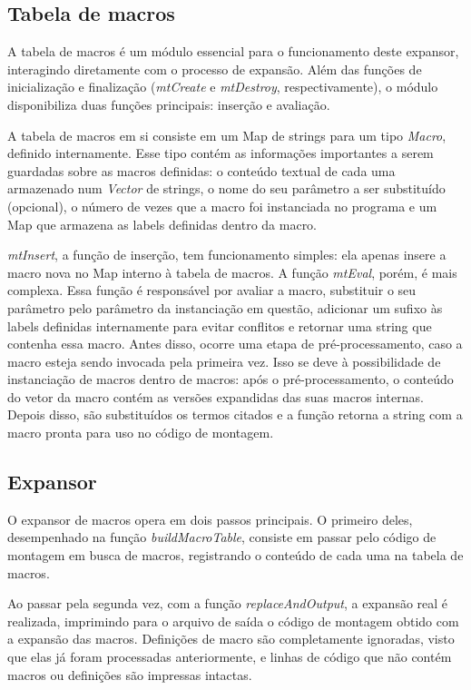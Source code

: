 \documentclass[12pt,a4paper]{article}
\numberwithin{equation}{section}
\begin{document}
\subsection{Tabela de macros}

A tabela de macros é um módulo essencial para o funcionamento deste expansor, interagindo diretamente com o processo de expansão. Além das funções de inicialização e finalização (\emph{mtCreate} e \emph{mtDestroy}, respectivamente), o módulo disponibiliza duas funções principais: inserção e avaliação.

A tabela de macros em si consiste em um Map de strings para um tipo \emph{Macro}, definido internamente. Esse tipo contém as informações importantes a serem guardadas sobre as macros definidas: o conteúdo textual de cada uma armazenado num \emph{Vector} de strings, o nome do seu parâmetro a ser substituído (opcional), o número de vezes que a macro foi instanciada no programa e um Map que armazena as labels definidas dentro da macro.

\emph{mtInsert}, a função de inserção, tem funcionamento simples: ela apenas insere a macro nova no Map interno à tabela de macros. A função \emph{mtEval}, porém, é mais complexa. Essa função é responsável por avaliar a macro, substituir o seu parâmetro pelo parâmetro da instanciação em questão, adicionar um sufixo às labels definidas internamente para evitar conflitos e retornar uma string que contenha essa macro. Antes disso, ocorre uma etapa de pré-processamento, caso a macro esteja sendo invocada pela primeira vez. Isso se deve à possibilidade de instanciação de macros dentro de macros: após o pré-processamento, o conteúdo do vetor da macro contém as versões expandidas das suas macros internas. Depois disso, são substituídos os termos citados e a função retorna a string com a macro pronta para uso no código de montagem.

\subsection{Expansor}

O expansor de macros opera em dois passos principais. O primeiro deles, desempenhado na função \emph{buildMacroTable}, consiste em passar pelo código de montagem em busca de macros, registrando o conteúdo de cada uma na tabela de macros. 

Ao passar pela segunda vez, com a função \emph{replaceAndOutput}, a expansão real é realizada, imprimindo para o arquivo de saída o código de montagem obtido com a expansão das macros. Definições de macro são completamente ignoradas, visto que elas já foram processadas anteriormente, e linhas de código que não contém macros ou definições são impressas intactas.
\end{document}
